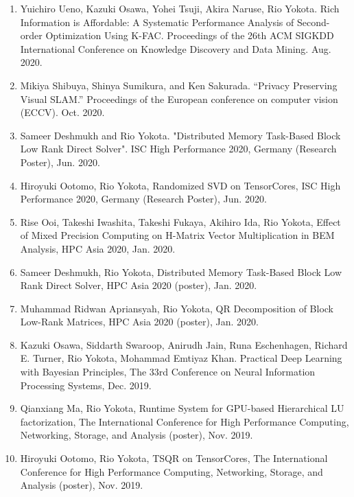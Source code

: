 \documentclass[margin,line]{cv}
\begin{document}
\begin{resume}
\begin{enumerate}
\item Yuichiro Ueno, Kazuki Osawa, Yohei Tsuji, Akira Naruse, Rio Yokota. Rich Information is Affordable: A Systematic Performance Analysis of Second-order Optimization Using K-FAC. Proceedings of the 26th ACM SIGKDD International Conference on Knowledge Discovery and Data Mining. Aug. 2020.

\item Mikiya Shibuya, Shinya Sumikura, and Ken Sakurada. “Privacy Preserving Visual SLAM.” Proceedings of the European conference on computer vision (ECCV). Oct. 2020.

\item Sameer Deshmukh and Rio Yokota. "Distributed Memory Task-Based Block Low Rank Direct Solver". ISC High Performance 2020, Germany (Research Poster), Jun. 2020.

\item Hiroyuki Ootomo, Rio Yokota, Randomized SVD on TensorCores, ISC High Performance 2020, Germany (Research Poster), Jun. 2020.

\item Rise Ooi, Takeshi Iwashita, Takeshi Fukaya, Akihiro Ida, Rio Yokota, Effect of Mixed Precision Computing on H-Matrix Vector Multiplication in BEM Analysis, HPC Asia 2020, Jan. 2020.

\item Sameer Deshmukh, Rio Yokota, Distributed Memory Task-Based Block Low Rank Direct Solver, HPC Asia 2020 (poster), Jan. 2020.

\item Muhammad Ridwan Apriansyah, Rio Yokota, QR Decomposition of Block Low-Rank Matrices, HPC Asia 2020 (poster), Jan. 2020.

\item Kazuki Osawa, Siddarth Swaroop, Anirudh Jain, Runa Eschenhagen, Richard E. Turner, Rio Yokota, Mohammad Emtiyaz Khan. Practical Deep Learning with Bayesian Principles, The 33rd Conference on Neural Information Processing Systems, Dec. 2019.

\item Qianxiang Ma, Rio Yokota, Runtime System for GPU-based Hierarchical LU factorization, The International Conference for High Performance Computing, Networking, Storage, and Analysis (poster), Nov. 2019.

\item Hiroyuki Ootomo, Rio Yokota, TSQR on TensorCores, The International Conference for High Performance Computing, Networking, Storage, and Analysis (poster), Nov. 2019.


\end{enumerate}
\end{resume}
\end{document}
